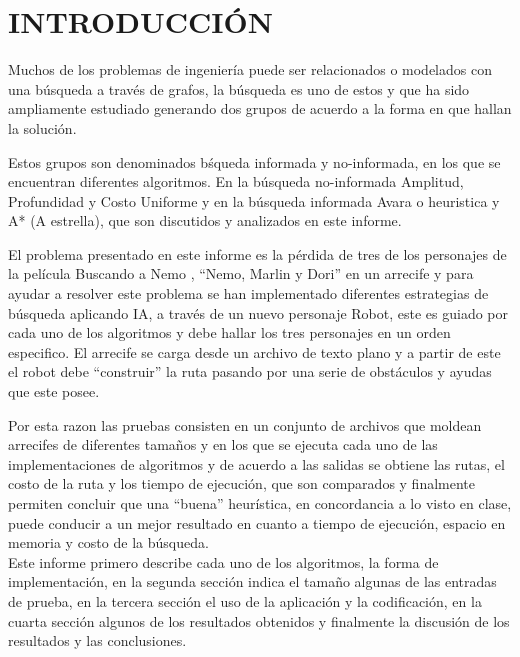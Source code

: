\section{INTRODUCCI\'ON}
\label{sec:intro}
Muchos de los problemas de ingenier\'ia puede ser relacionados o modelados con una b\'usqueda a trav\'es de grafos, la b\'usqueda es uno de estos y que ha sido ampliamente estudiado generando dos grupos de acuerdo a la forma en que hallan la soluci\'on.

Estos grupos son denominados b\'squeda informada y no-informada, en los que se encuentran diferentes algoritmos. En la b\'usqueda no-informada Amplitud, Profundidad y Costo Uniforme y en la b\'usqueda informada Avara o heuristica y A* (A estrella), que son discutidos y analizados en este informe.

El problema presentado en este informe es la p\'erdida de tres de los personajes de la pel\'icula Buscando a Nemo \cite{wiki:nemo}, ``Nemo, Marlin y Dori'' en un arrecife y para ayudar a resolver este problema se han implementado diferentes estrategias de b\'usqueda aplicando IA, a trav\'es de un nuevo personaje Robot, este es guiado por cada uno de los algoritmos y debe hallar los tres personajes en un orden especifico. El arrecife se carga desde un archivo de texto plano y a partir de este el robot debe ``construir'' la ruta pasando por una serie de obst\'aculos y ayudas que este posee.

Por esta razon las pruebas consisten en un conjunto de archivos que moldean arrecifes de diferentes tama\~nos y en los que se ejecuta cada uno de las implementaciones de algoritmos y de acuerdo a las salidas se obtiene las rutas, el costo de la ruta y los tiempo de ejecuci\'on, que son comparados y finalmente permiten concluir que una ``buena'' heurística, en concordancia a lo visto en clase, puede conducir a un mejor resultado en cuanto a tiempo de ejecuci\'on, espacio en memoria y costo de la b\'usqueda.\\

Este informe primero describe cada uno de los algoritmos, la forma de implementaci\'on, en la segunda secci\'on indica el tama\~no algunas de las entradas de prueba, en la tercera secci\'on el uso de la aplicaci\'on y la codificaci\'on, en la cuarta secci\'on algunos de los resultados obtenidos y finalmente la discusi\'on de los resultados y las conclusiones.
 
